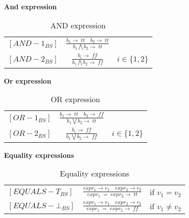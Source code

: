 \textbf{And expression}
	
    \bgroup
    \def\arraystretch{3}
    \begin{table}[H]
    \centering
    \begin{tabular}{l c l}
        
        $[AND-1_{BS}]$ &$\frac{b_1 \rightarrow \; tt \quad b_2 \rightarrow \; tt}{b_1 \bigwedge b_2 \rightarrow \; tt}$ & \\
    
        $[AND-2_{BS}]$ &$\frac{b_i \rightarrow \; ff}{b_1 \bigwedge b_2 \rightarrow \; ff}$ & $i \in \{1, 2\}$\\
        
    \end{tabular}
    \caption{AND expression}
    \label{tab:andexpr}
    \end{table}
    \egroup

\noindent \textbf{Or expression}

    \bgroup
    \def\arraystretch{3}
    \begin{table}[H]
    \centering
    \begin{tabular}{l c l}
        
        $[OR-1_{BS}]$ &$\frac{b_1 \rightarrow \; tt \quad b_2 \rightarrow \; ff}{b_1 \bigvee b_2 \rightarrow \; tt}$ & \\
    
        $[OR-2_{BS}]$ &$\frac{b_i \rightarrow \; ff}{b_1 \bigvee b_2 \rightarrow \; ff}$ & $i \in \{1, 2\}$\\
        
    \end{tabular}
    \caption{OR expression}
    \label{tab:orexpr}
    \end{table}
    \egroup
    
\noindent \textbf{Equality expressions}
  
    \bgroup
    \def\arraystretch{3}
    \begin{table}[H]
    \centering
    \begin{tabular}{l c l}
        
        $[EQUALS-T_{BS}]$ &$\frac{expr_1 \rightarrow v_1 \quad expr_2 \rightarrow v_2}{expr_1\;=\;expr_2 \rightarrow \; tt}$ & if $v_1 = v_2$ \\
        
        $[EQUALS-\bot_{BS}]$ &$\frac{expr_1 \rightarrow v_1 \quad expr_2 \rightarrow v_2}{expr_1\;=\;expr_2 \rightarrow \; ff}$ & if $v_1 \ne v_2$ \\
        
    \end{tabular}
    \caption{Equality expressions}
    \label{tab:equaexpr}
    \end{table}
    \egroup

